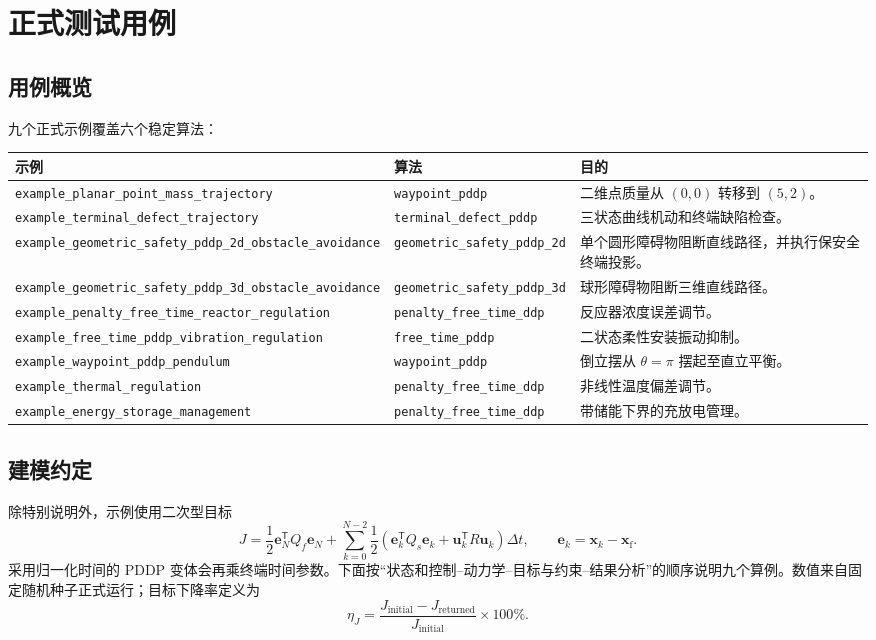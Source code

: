 \documentclass[UTF8,zihao=-4,openany,fontset=fandol]{ctexbook}
\newcommand{\code}[1]{\nolinkurl{#1}}
\begin{document}
\chapter{正式测试用例}

\section{用例概览}

九个正式示例覆盖六个稳定算法：

\begin{longtable}{p{}p{}p{}}
\toprule
示例 & 算法 & 目的\\
\midrule
\endhead
\code{example_planar_point_mass_trajectory} &
\code{waypoint_pddp} &
二维点质量从 $(0,0)$ 转移到 $(5,2)$。\\
\code{example_terminal_defect_trajectory} &
\code{terminal_defect_pddp} &
三状态曲线机动和终端缺陷检查。\\
\code{example_geometric_safety_pddp_2d_obstacle_avoidance} &
\code{geometric_safety_pddp_2d} &
单个圆形障碍物阻断直线路径，并执行保安全终端投影。\\
\code{example_geometric_safety_pddp_3d_obstacle_avoidance} &
\code{geometric_safety_pddp_3d} &
球形障碍物阻断三维直线路径。\\
\code{example_penalty_free_time_reactor_regulation} &
\code{penalty_free_time_ddp} &
反应器浓度误差调节。\\
\code{example_free_time_pddp_vibration_regulation} &
\code{free_time_pddp} &
二状态柔性安装振动抑制。\\
\code{example_waypoint_pddp_pendulum} &
\code{waypoint_pddp} &
倒立摆从 $\theta=\pi$ 摆起至直立平衡。\\
\code{example_thermal_regulation} &
\code{penalty_free_time_ddp} &
非线性温度偏差调节。\\
\code{example_energy_storage_management} &
\code{penalty_free_time_ddp} &
带储能下界的充放电管理。\\
\bottomrule
\end{longtable}

\section{建模约定}

除特别说明外，示例使用二次型目标
\begin{equation}
  J=
  \frac12\bm e_N^\mathsf{T}Q_f\bm e_N+
  \sum_{k=0}^{N-2}
  \frac12\left(
    \bm e_k^\mathsf{T}Q_s\bm e_k+
    \bm u_k^\mathsf{T}R\bm u_k
  \right)\Delta t,
  \qquad
  \bm e_k=\bm x_k-\bm x_{\mathrm f}.
\end{equation}
采用归一化时间的 PDDP 变体会再乘终端时间参数。下面按“状态和控制--动力学--目标与约束--结果分析”的顺序说明九个算例。数值来自固定随机种子正式运行；目标下降率定义为
\begin{equation}
  \eta_J=
  \frac{J_{\mathrm{initial}}-J_{\mathrm{returned}}}
       {J_{\mathrm{initial}}}\times100\%.
\end{equation}
\end{document}
